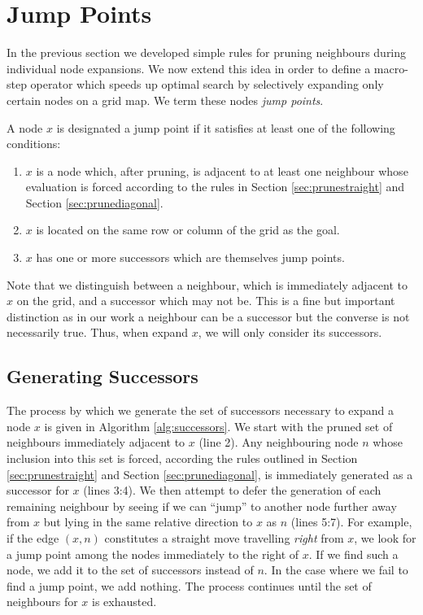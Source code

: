 \section{Jump Points}
In the previous section we developed simple rules for pruning neighbours during 
individual node expansions. We now extend this idea in order to define a 
macro-step operator which speeds up optimal search by selectively expanding
only certain nodes on a grid map. We term these nodes \emph{jump points}.


\begin{definition}
\label{def:jump}
A node $x$ is designated a jump point if it satisfies at least one of the following
conditions:
\begin{enumerate}
\item{$x$ is a node which, after pruning, is adjacent to at least one neighbour
whose evaluation is forced according to the rules in Section
\ref{sec:prunestraight} and Section \ref{sec:prunediagonal}.}
\item{$x$ is located on the same row or column of the grid as the goal.}
\item{$x$ has one or more successors which are themselves jump points.}
\end{enumerate}
\end{definition}

Note that we distinguish between a neighbour, which is immediately adjacent to
$x$ on the grid, and a successor which may not be. 
This is a fine but important distinction as in our work a neighbour can be a 
successor but the converse is not necessarily true.
Thus, when expand $x$, we will only consider its successors.


\subsection{Generating Successors}
The process by which we generate the set of successors necessary to expand a
node $x$ is given in Algorithm \ref{alg:successors}.
We start with the pruned set of neighbours immediately adjacent to $x$ (line 2).
Any neighbouring node $n$ whose inclusion into this set is forced, according the 
rules outlined in Section \ref{sec:prunestraight} and Section 
\ref{sec:prunediagonal}, is immediately generated as a successor for $x$ 
(lines 3:4).
We then attempt to defer the generation of each remaining neighbour by seeing if 
we can ``jump'' to another node further away from $x$ but lying in the same 
relative direction to $x$ as $n$ (lines 5:7). For example, if the edge $(x, n)$ constitutes a
straight move travelling \emph{right} from $x$, we look for a jump point among
the nodes immediately to the right of $x$.
If we find such a node, we add it to the set of successors instead of $n$.
In the case where we fail to find a jump point, we add nothing.
The process continues until the set of neighbours for $x$ is exhausted.

